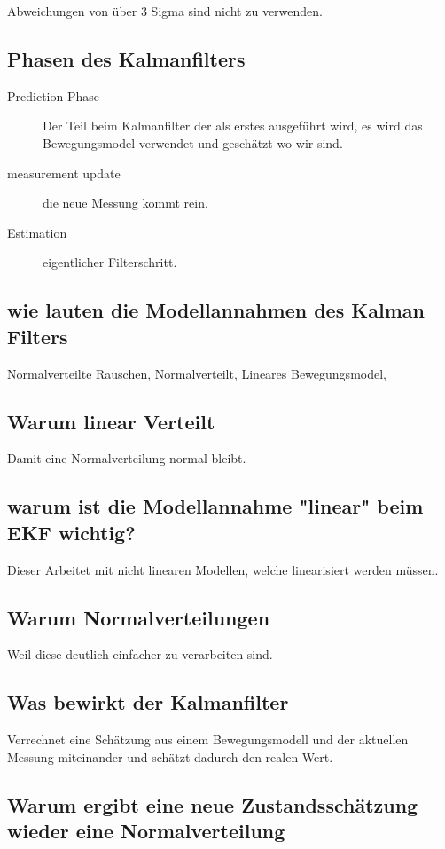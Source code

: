 Abweichungen von über 3 Sigma sind nicht zu verwenden.

\subsection{Phasen des Kalmanfilters}
\begin{description}
\item[Prediction Phase] Der Teil beim Kalmanfilter der als erstes ausgeführt wird, es wird das Bewegungsmodel verwendet und geschätzt wo wir sind.
\item[measurement update] die neue Messung kommt rein.
\item[Estimation] eigentlicher Filterschritt.
\end{description}

\subsection{wie lauten die Modellannahmen des Kalman Filters}
Normalverteilte Rauschen, Normalverteilt, Lineares Bewegungsmodel,
\subsection{Warum linear Verteilt}
Damit eine Normalverteilung normal bleibt. 

\subsection{warum ist die Modellannahme "linear" beim EKF wichtig?}

Dieser Arbeitet mit nicht linearen Modellen, welche linearisiert werden müssen.

\subsection{Warum Normalverteilungen}
Weil diese deutlich einfacher zu verarbeiten sind.  

\subsection{Was bewirkt der Kalmanfilter}
Verrechnet eine Schätzung aus einem Bewegungsmodell und der aktuellen Messung miteinander und schätzt dadurch den realen Wert.

\subsection{Warum ergibt eine neue Zustandsschätzung wieder eine Normalverteilung}

